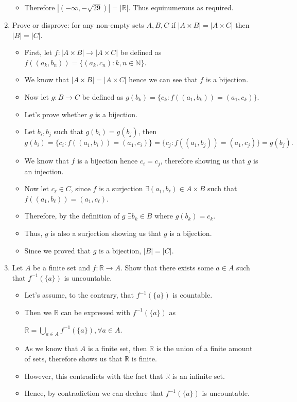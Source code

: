 \documentclass[letterpaper,12pt]{article}
\begin{document}
\begin{enumerate}
\begin{itemize}
	\item Therefore $|(-\infty,-\sqrt{29})| = |\mathbb{R}|$. Thus equinumerous as required.
\end{itemize}
\item Prove or disprove: for any non-empty sets $A,B,C$ if $| A \times B| = |A \times C|$ then $|B|  = |C| $.
\begin{itemize}
	\item First, let $f:|A \times B| \rightarrow |A \times C|$ be defined as $f((a_k,b_n))=\{(a_k,c_n) : k,n \in \mathbb{N}\}$.
	\item We know that $|A\times B|=|A \times C|$ hence we can see that $f$ is a bijection.
	\item Now let $g:B \rightarrow C$ be defined as $g(b_k)=\{c_k : f((a_1,b_k)) =(a_1,c_k)\}.$
	\item Let's prove whether $g$ is a bijection.
	\item Let $b_i,b_j$ such that $g(b_i)=g(b_j)$,  then $g(b_i) = \{c_i : f((a_1,b_i))=(a_1,c_i)\} = \{c_j : f((a_1,b_j)) = (a_1,c_j)\} = g(b_j).$
	\item We know that $f$ is a bijection hence $c_i = c_j$, therefore showing us that $g$ is an injection.
	\item Now let $c_\ell \in C$, since $f$ is a surjection $\exists (a_1,b_\ell) \in A \times B$ such that $f((a_1,b_\ell)) = (a_1,c_\ell)$.
	\item Therefore, by the definition of $g$ $\exists b_k \in B$ where $g(b_k)=c_k$.
	\item Thus, $g$ is also a surjection showing us that $g$ is a bijection.
	\item Since we proved that $g$ is a bijection, $|B|=|C|.$
\end{itemize}
\item Let $A$ be a finite set and $f: \mathbb{R} \rightarrow A.$ Show that there exists some $a \in A$ such that $f^{-1}(\{a\})$ is uncountable.
\begin{itemize}
	\item Let's assume, to the contrary, that $f^{-1}(\{a\})$ is countable.
	\item Then we $\mathbb{R}$ can be expressed with $f^{-1}(\{a\})$ as
	\begin{center}
	$\mathbb{R} = \bigcup_{a \in A} f^{-1}(\{a\}), \forall a \in A$.	
	\end{center}
	\item As we know that $A$ is a finite set, then $\mathbb{R}$ is the union of a finite amount of sets, therefore shows us that $\mathbb{R}$ is finite.
	\item However, this contradicts with the fact that $\mathbb{R}$ is an infinite set.
	\item Hence, by contradiction we can declare that $f^{-1}(\{a\})$ is uncountable.

\end{itemize}
\end{enumerate}




\end{document}
